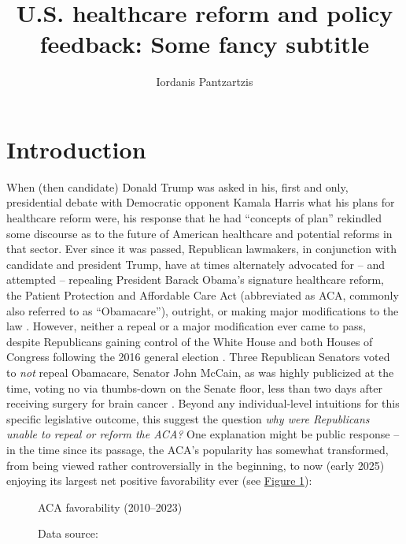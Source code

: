 \documentclass[11pt]{article}
\author[1]{Iordanis Pantzartzis}
\affil[1]{Universität Konstanz, 01/1001158}
\title{U.S. healthcare reform and policy feedback: Some fancy subtitle}
\begin{document}


\restoregeometry

\maketitle

\section*{Introduction}

When (then candidate) Donald Trump was asked in his, first and only, presidential debate with Democratic opponent Kamala Harris what his plans for healthcare reform were, his response that he had \enquote{concepts of plan} \parencite[][]{Trump2024} rekindled some discourse as to the future of American healthcare and potential reforms in that sector. Ever since it was passed, Republican lawmakers, in conjunction with candidate and president Trump, have at times alternately advocated for -- and attempted -- repealing President Barack Obama's signature healthcare reform, the Patient Protection and Affordable Care Act (abbreviated as ACA, commonly also referred to as \enquote{Obamacare}), outright, or making major modifications to the law \parencite[][]{Armour2024}. However, neither a repeal or a major modification ever came to pass, despite Republicans gaining control of the White House and both Houses of Congress following the 2016 general election \parencite[][]{FEC2016}. Three Republican Senators voted to \textit{not} repeal Obamacare, Senator John McCain, as was highly publicized at the time, voting no via thumbs-down on the Senate floor, less than two days after receiving surgery for brain cancer \parencite[][]{Davis2016}. Beyond any individual-level intuitions for this specific legislative outcome, this suggest the question \textit{why were Republicans unable to repeal or reform the ACA?} One explanation might be public response -- in the time since its passage, the ACA's popularity has somewhat transformed, from being viewed rather controversially in the beginning, to now (early 2025) enjoying its largest net positive favorability ever (see \hyperref[fig:aca_fav]{Figure 1}):\\

\begin{figure}[H]
  \sffamily
  \caption{ACA favorability (2010--2023)}
  
  \label{fig:aca_fav}
  \caption*{Data source: \textcite[][]{KFF1}}
\end{figure}
\end{document}
